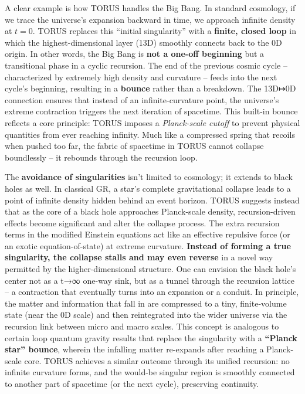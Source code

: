 \documentclass[
]{article}
\begin{document}
{A clear example is how TORUS handles the Big Bang. In standard
cosmology, if we trace the universe's expansion backward in time, we
approach infinite density at $t =$0. TORUS replaces this ``initial
singularity'' with a \textbf{finite, closed loop} in which the
highest-dimensional layer (13D) smoothly connects back to the 0D origin.
In other words, the Big Bang is \textbf{not a one-off beginning} but a
transitional phase in a cyclic recursion. The end of the previous cosmic
cycle -- characterized by extremely high density and curvature -- feeds
into the next cycle's beginning, resulting in a \textbf{bounce} rather
than a breakdown\hspace{0pt}. The 13D↦0D connection ensures that instead
of an infinite-curvature point, the universe's extreme contraction
triggers the next iteration of spacetime. This built-in bounce reflects
a core principle: TORUS imposes a \emph{Planck-scale cutoff} to prevent
physical quantities from ever reaching infinity\hspace{0pt}. Much like a
compressed spring that recoils when pushed too far, the fabric of
spacetime in TORUS cannot collapse boundlessly -- it rebounds through
the recursion loop.

The \textbf{avoidance of singularities} isn't limited to cosmology; it
extends to black holes as well. In classical GR, a star's complete
gravitational collapse leads to a point of infinite density hidden
behind an event horizon. TORUS suggests instead that as the core of a
black hole approaches Planck-scale density, recursion-driven effects
become significant and alter the collapse process. The extra recursion
terms in the modified Einstein equations act like an effective repulsive
force (or an exotic equation-of-state) at extreme curvature.
\textbf{Instead of forming a true singularity, the collapse stalls and
may even reverse} in a novel way permitted by the higher-dimensional
structure. One can envision the black hole's center not as a t→∞ one-way
sink, but as a tunnel through the recursion lattice -- a contraction
that eventually turns into an expansion or a conduit. In principle, the
matter and information that fall in are compressed to a tiny,
finite-volume state (near the 0D scale) and then reintegrated into the
wider universe via the recursion link between micro and macro scales.
This concept is analogous to certain loop quantum gravity results that
replace the singularity with a \textbf{``Planck star'' bounce}, wherein
the infalling matter re-expands after reaching a Planck-scale core.
TORUS achieves a similar outcome through its unified recursion: no
infinite curvature forms, and the would-be singular region is smoothly
connected to another part of spacetime (or the next cycle), preserving
continuity.

}
\end{document}
